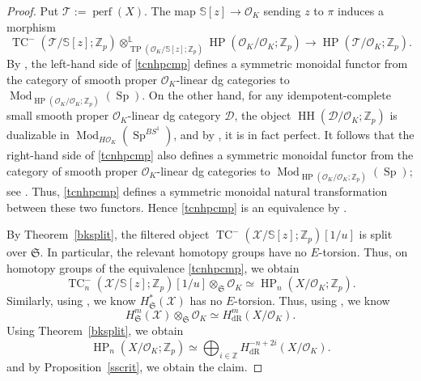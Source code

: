 \documentclass[11pt]{amsart}
\numberwithin{equation}{section}
\renewcommand{\L}{\mathbb{L}}
\newcommand{\Z}{\mathbb{Z}}
\newcommand{\sD}{\mathcal{D}}
\newcommand{\sO}{\mathcal{O}}
\newcommand{\sT}{\mathcal{T}}
\newcommand{\sX}{\mathcal{X}}
\newcommand{\mf}{\mathfrak}
\newcommand{\Mod}{\operatorname{Mod}}
\newcommand{\dR}{\operatorname{{dR}}}
\newcommand{\perf}{\operatorname{perf}}
\newcommand{\mS}{\mf{S}}
\newcommand{\Sp}{\operatorname{Sp}}
\numberwithin{equation}{section}
\newcommand{\HH}{\operatorname{HH}}
\newcommand{\TP}{\operatorname{TP}}
\newcommand{\TCn}{\operatorname{TC}^{-}}
\newcommand{\HP}{\operatorname{HP}}
\newcommand{\bS}{\mathbb{S}}
\begin{document}
\begin{proof}
Put $\sT:=\perf(X)$. The map $\bS[z]\to \sO_K$ sending $z$ to $\pi$ induces a morphism
\begin{equation}\label{tcnhpcmp}
\TCn(\sT/\bS[z];\Z_p)\otimes^{\L}_{\TP(\sO_K/\bS[z];\Z_p)} \HP(\sO_K/\sO_K;\Z_p)
\longrightarrow
\HP(\sT/\sO_K;\Z_p).
\end{equation}
By \cite[Proposition 2.16]{M26}, the left-hand side of \eqref{tcnhpcmp} defines a symmetric monoidal functor from the category of smooth proper $\sO_K$-linear dg categories to $\Mod_{\HP(\sO_K/\sO_K;\Z_p)}(\Sp)$. On the other hand, for any idempotent-complete small smooth proper $\sO_K$-linear dg category $\sD$, the object $\HH(\sD/\sO_K;\Z_p)$ is dualizable in $\Mod_{H\sO_K}(\Sp^{BS^1})$, and by \cite[Theorem 2.15]{AMN18}, it is in fact perfect. It follows that the right-hand side of \eqref{tcnhpcmp} also defines a symmetric monoidal functor from the category of smooth proper $\sO_K$-linear dg categories to $\Mod_{\HP(\sO_K/\sO_K;\Z_p)}(\Sp)$; see \cite{AMN18}. Thus, \eqref{tcnhpcmp} defines a symmetric monoidal natural transformation between these two functors. Hence \eqref{tcnhpcmp} is an equivalence by \cite[Proposition 4.6]{AMN18}. 

By Theorem~\ref{bksplit}, the filtered object
$\TCn(\sX/\bS[z];\Z_p)[1/u]$ is split over $\mS$. In particular, the relevant homotopy groups have no $E$-torsion. Thus, on homotopy groups of the equivalence \eqref{tcnhpcmp}, we obtain
\begin{equation}\label{hpbase}
\TCn_n(\sX/\bS[z];\Z_p)[1/u] \otimes_{\mS}\sO_K \simeq \HP_n(X/\sO_K;\Z_p).
\end{equation}
Similarly, using \cite[Theorem 5.11]{M21}, we know $H_{\mS}^*(\sX)$ has no $E$-torsion. Thus, using \cite[Theorem 1.2]{BMS19}, we know
\[
  H_{\mS}^m(\sX) \otimes_{\mS}\sO_K \simeq H_{\dR}^m(X/\sO_K).
  \]
  Using Theorem~\ref{bksplit}, we obtain 
  \[
    \HP_n(X/\sO_K;\Z_p) \simeq \bigoplus_{i\in\Z}H_{\dR}^{-n+2i}(X/\sO_K).
    \]
    and by Proposition~\ref{sscrit}, we obtain the claim.
\end{proof}
\end{document}

